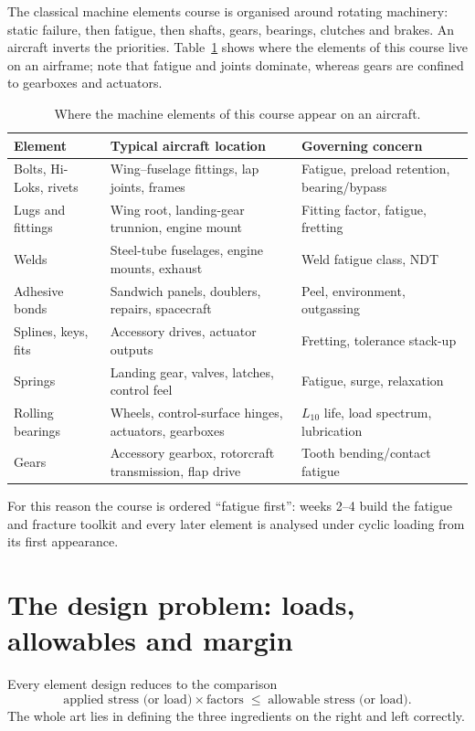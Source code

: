 \documentclass[11pt,a4paper]{article}
\begin{document}
The classical machine elements course is organised around rotating machinery: static failure, then fatigue, then shafts, gears, bearings, clutches and brakes. An aircraft inverts the priorities. Table~\ref{tab:where} shows where the elements of this course live on an airframe; note that fatigue and joints dominate, whereas gears are confined to gearboxes and actuators.

\begin{table}[h]
\centering\footnotesize
\begin{tabular}{@{}lp{5.2cm}p{5cm}@{}}
\toprule
Element & Typical aircraft location & Governing concern \\
\midrule
Bolts, Hi-Loks, rivets & Wing--fuselage fittings, lap joints, frames & Fatigue, preload retention, bearing/bypass \\
Lugs and fittings & Wing root, landing-gear trunnion, engine mount & Fitting factor, fatigue, fretting \\
Welds & Steel-tube fuselages, engine mounts, exhaust & Weld fatigue class, NDT \\
Adhesive bonds & Sandwich panels, doublers, repairs, spacecraft & Peel, environment, outgassing \\
Splines, keys, fits & Accessory drives, actuator outputs & Fretting, tolerance stack-up \\
Springs & Landing gear, valves, latches, control feel & Fatigue, surge, relaxation \\
Rolling bearings & Wheels, control-surface hinges, actuators, gearboxes & $L_{10}$ life, load spectrum, lubrication \\
Gears & Accessory gearbox, rotorcraft transmission, flap drive & Tooth bending/contact fatigue \\
\bottomrule
\end{tabular}
\caption{Where the machine elements of this course appear on an aircraft.}
\label{tab:where}
\end{table}

For this reason the course is ordered ``fatigue first'': weeks 2--4 build the fatigue and fracture toolkit and every later element is analysed under cyclic loading from its first appearance.

\section{The design problem: loads, allowables and margin}

Every element design reduces to the comparison
\begin{equation}
  \text{applied stress (or load)} \times \text{factors} \;\le\; \text{allowable stress (or load)}.
\end{equation}
The whole art lies in defining the three ingredients on the right and left correctly.
\end{document}
